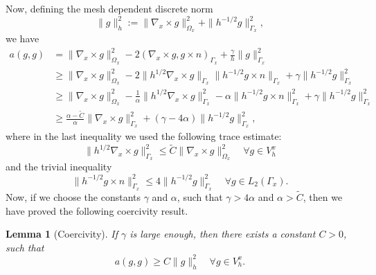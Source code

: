 \documentclass[reqno,a4paper]{amsart}
\newtheorem{lemma}[theorem]{Lemma}
\theoremstyle{remark}
\numberwithin{equation}{section}
\newcommand{\norm}[1]{\|#1\|}
\def\curl{\nabla_x \times }
\begin{document}
Now, defining the mesh dependent discrete norm
\[
\norm{g}^2_h := \norm{\curl g}^2_{\Omega_x} + \norm{h^{-1/2} g}^2_{\Gamma_x},
\]
we have
\[
\begin{aligned}
a(g, g) &= \norm{\curl g}^2_{\Omega_x} - 2(\curl g, g \times n)_{\Gamma_x}
+ \frac{\gamma}{h}\norm{g}^2_{\Gamma_x} \\
&\geq \norm{\curl g}^2_{\Omega_x} - 
2\norm{h^{1/2} \curl g}_{\Gamma_x} \norm{h^{-1/2} g \times n}_{\Gamma_x}
+ \gamma \norm{h^{-1/2} g}^2_{\Gamma_x} \\
&\geq \norm{\curl g}^2_{\Omega_x} - 
\frac{1}{\alpha}\norm{h^{1/2} \curl g}^2_{\Gamma_x}
- \alpha \norm{h^{-1/2} g \times n}^2_{\Gamma_x} 
+ \gamma \norm{h^{-1/2} g}^2_{\Gamma_x} \\
&\geq \frac{\alpha - \tilde{C}}{\alpha} \norm{\curl g}^2_{\Gamma_x} + 
(\gamma - 4\alpha) \norm{h^{-1/2} g}^2_{\Gamma_x},
\end{aligned}
\]
where in the last inequality we used the following trace estimate: 
\[
\norm{h^{1/2} \curl g}^2_{\Gamma_x} 
\leq \tilde{C} \norm{\curl g}^2_{\Omega_x} \quad \forall g \in V^x_h
\]
and the trivial inequality 
\begin{equation}\label{triv_ineq}
\norm{h^{-1/2} g \times n}^2_{\Gamma_x} 
\leq 4 \norm{h^{-1/2} g}^2_{\Gamma_x} \quad \forall g \in L_2 (\Gamma_x).
\end{equation}
Now, if we choose the constants $ \gamma $ and 
$ \alpha $, such that $ \gamma > 4 \alpha $ and $ \alpha > \tilde{C} $,
then we have proved the following coercivity result.
\begin{lemma} [Coercivity] \label{coercLemma}
If $ \gamma $ is large enough, then there exists a constant $ C > 0 $,
 such that
\[
a(g, g) \geq C \norm{g}^2_h \quad \forall g \in V^x_h.
\]
\end{lemma}
\end{document}
